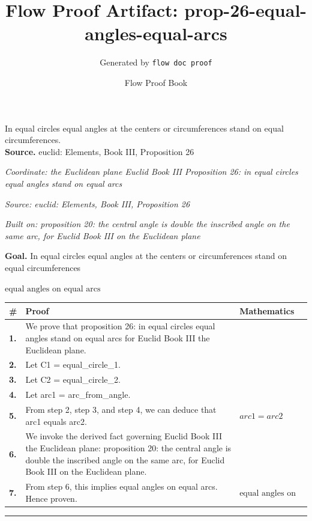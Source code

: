 \documentclass[11pt]{article}
\title{Flow Proof Artifact: prop-26-equal-angles-equal-arcs}
\author{Generated by \texttt{flow doc proof}}
\date{Flow Proof Book}
\theoremstyle{definition}
\begin{document}
\maketitle
In equal circles equal angles at the centers or circumferences stand on equal circumferences.\\[0.5em]
\textbf{Source.} euclid: Elements, Book III, Proposition 26\\[0.5em]
\bigskip
{}\par
\smallskip\noindent\textit{Coordinate: the Euclidean plane \cdot Euclid Book III \cdot Proposition 26: in equal circles equal angles stand on equal arcs}\par
\smallskip\noindent\textit{Source: euclid: Elements, Book III, Proposition 26}\par
\smallskip\noindent\textit{Built on: proposition 20: the central angle is double the inscribed angle on the same arc, for Euclid Book III on the Euclidean plane}\par
\medskip
\noindent\textbf{Goal.} In equal circles equal angles at the centers or circumferences stand on equal circumferences\par
\noindent$\displaystyle \text{equal angles on equal arcs}$\par
\medskip
\noindent
\begin{tabular}{@{} >{\raggedright\arraybackslash}p{} >{\raggedright\arraybackslash}p{} >{\raggedleft\arraybackslash}p{} @{}}
\textbf{\#} & \textbf{Proof} & \textbf{Mathematics} \\
\midrule
\textbf{1.} & We prove that proposition 26: in equal circles equal angles stand on equal arcs for Euclid Book III the Euclidean plane. & \\[0.45em]
\textbf{2.} & Let C1 = equal\_circle\_1. & \\[0.45em]
\textbf{3.} & Let C2 = equal\_circle\_2. & \\[0.45em]
\textbf{4.} & Let arc1 = arc\_from\_angle. & \\[0.45em]
\textbf{5.} & From step 2, step 3, and step 4, we can deduce that arc1 equals arc2. & $\displaystyle arc1 = arc2$ \\[0.45em]
\textbf{6.} & We invoke the derived fact governing Euclid Book III the Euclidean plane: proposition 20: the central angle is double the inscribed angle on the same arc, for Euclid Book III on the Euclidean plane. & \\[0.45em]
\textbf{7.} & From step 6, this implies equal angles on equal arcs. Hence proven. & $\displaystyle \text{equal angles on equal arcs}$ \\[0.45em]
\bottomrule
\end{tabular}
\label{thm:Geometry-Euclid Book III-proposition_26_in_equal_circles_equal_angles_stand_on_equal_arcs}
\par\medskip\hrule
\end{document}
